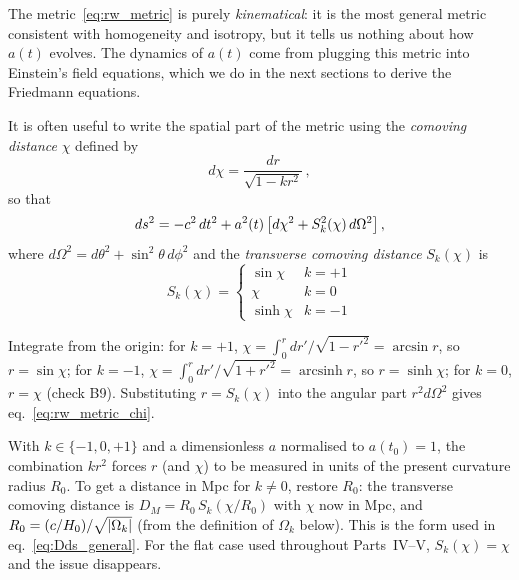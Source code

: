 \begin{remark}
The metric~\eqref{eq:rw_metric} is purely \textit{kinematical}: it is
the most general metric consistent with homogeneity and isotropy, but
it tells us nothing about how $a(t)$ evolves.  The dynamics of $a(t)$
come from plugging this metric into Einstein's field equations, which we
do in the next sections to derive the Friedmann equations.
\end{remark}

It is often useful to write the spatial part of the metric using the
\emph{comoving distance} $\chi$ defined by
\begin{equation}
    d\chi = \frac{dr}{\sqrt{1 - kr^2}} \,,
    \label{eq:comoving_distance_def}
\end{equation}
so that
\begin{equation}
    ds^2 = -c^2\, dt^2
    + a^2(t)\left[d\chi^2 + S_k^2(\chi)\, d\Omega^2\right] ,
    \label{eq:rw_metric_chi}
\end{equation}
where $d\Omega^2 = d\theta^2 + \sin^2\!\theta\, d\phi^2$ and the
\emph{transverse comoving distance} $S_k(\chi)$ is
\begin{equation}
    S_k(\chi) = \begin{cases}
    \sin\chi & k = +1 \\
    \chi     & k = 0 \\
    \sinh\chi & k = -1
    \end{cases}
    \label{eq:Sk}
\end{equation}


\begin{derivation}[From $d\chi = dr/\sqrt{1-kr^2}$ to $r = S_k(\chi)$]
Integrate from the origin: for $k = +1$, $\chi = \int_0^r dr'/\sqrt{1-r'^2}
= \arcsin r$, so $r = \sin\chi$; for $k = -1$, $\chi = \int_0^r
dr'/\sqrt{1+r'^2} = \operatorname{arcsinh} r$, so $r = \sinh\chi$; for $k=0$,
$r = \chi$ (check B9).  Substituting $r = S_k(\chi)$ into the angular part
$r^2 d\Omega^2$ gives eq.~\eqref{eq:rw_metric_chi}.
\end{derivation}

\begin{annotation}[Units trap: $k = \pm1$ makes $r$ and $\chi$ dimensionless]
With $k \in \{-1,0,+1\}$ and a dimensionless $a$ normalised to $a(t_0) = 1$,
the combination $kr^2$ forces $r$ (and $\chi$) to be measured in units of the
present curvature radius $R_0$.  To get a distance in Mpc for $k \neq 0$, restore
$R_0$: the transverse comoving distance is $D_M = R_0\,S_k(\chi/R_0)$ with $\chi$
now in Mpc, and $R_0 = (c/H_0)/\sqrt{|\Omega_k|}$ (from the
definition of $\Omega_k$ below).  This is the form used in
eq.~\eqref{eq:Dds_general}.  For the flat case used throughout Parts~IV--V,
$S_k(\chi) = \chi$ and the issue disappears.
\end{annotation}

